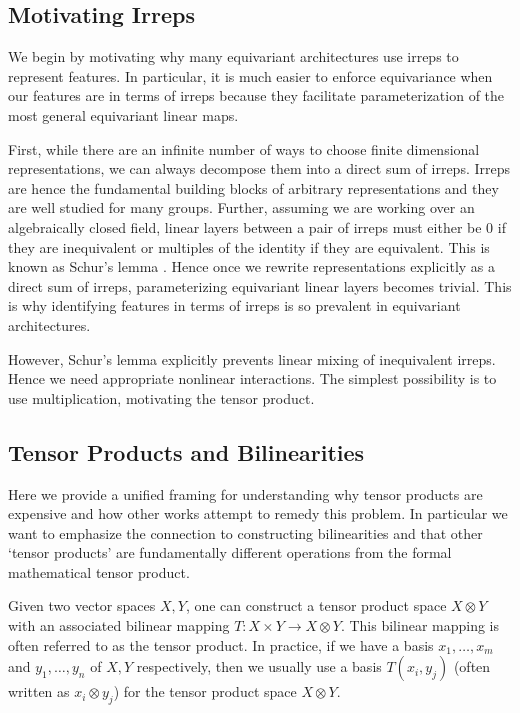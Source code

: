 \documentclass{article}
\theoremstyle{definition}
\theoremstyle{remark}
\begin{document}
\subsection{Motivating Irreps}
We begin by motivating why many equivariant architectures \citep{geiger2022e3nn,unke2024e3x} use irreps to represent features. In particular, it is much easier to enforce equivariance when our features are in terms of irreps because they facilitate parameterization of the most general equivariant linear maps.

First, while there are an infinite number of ways to choose finite dimensional representations, we can always decompose them into a direct sum of irreps. Irreps are hence the fundamental building blocks of arbitrary representations and they are well studied for many groups. Further, assuming we are working over an algebraically closed field, linear layers between a pair of irreps must either be 0 if they are inequivalent or multiples of the identity if they are equivalent. This is known as Schur's lemma \citep{dresselhaus2007group}. Hence once we rewrite representations explicitly as a direct sum of irreps, parameterizing equivariant linear layers becomes trivial. This is why identifying features in terms of irreps is so prevalent in equivariant architectures.

However, Schur's lemma explicitly prevents linear mixing of inequivalent irreps. Hence we need appropriate nonlinear interactions. The simplest possibility is to use multiplication, motivating the tensor product.



\subsection{Tensor Products and Bilinearities}
\label{sec:bilinearities}

Here we provide a unified framing for understanding why tensor products are expensive and how other works attempt to remedy this problem. In particular we want to emphasize the connection to constructing bilinearities and that other `tensor products' are fundamentally different operations from the formal mathematical tensor product.

Given two vector spaces $X, Y$, one can construct a tensor product space $X\otimes Y$ with an associated bilinear mapping $T:X\times Y\to X\otimes Y$. This bilinear mapping is often referred to as the tensor product. In practice, if we have a basis $x_1,\ldots,x_m$ and $y_1,\ldots,y_n$ of $X, Y$ respectively, then we usually use a basis $T(x_i, y_j)$ (often written as $x_i\otimes y_j$) for the tensor product space $X\otimes Y$.
\end{document}
